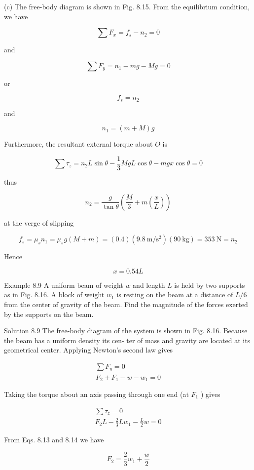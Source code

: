 \documentclass[10pt]{article}
\begin{document}
(c) The free-body diagram is shown in Fig. 8.15. From the equilibrium condition, we have

$$
\sum F_{x}=f_{s}-n_{2}=0
$$

and

$$
\sum F_{y}=n_{1}-m g-M g=0
$$

or

$$
f_{s}=n_{2}
$$

and

$$
n_{1}=(m+M) g
$$

Furthermore, the resultant external torque about $O$ is

$$
\sum \tau_{z}=n_{2} L \sin \theta-\frac{1}{3} M g L \cos \theta-m g x \cos \theta=0
$$

thus

$$
n_{2}=\frac{g}{\tan \theta}\left(\frac{M}{3}+m\left(\frac{x}{L}\right)\right)
$$

at the verge of slipping

$$
f_{s}=\mu_{s} n_{1}=\mu_{s} g(M+m)=(0.4)\left(9.8 \mathrm{~m} / \mathrm{s}^{2}\right)(90 \mathrm{~kg})=353 \mathrm{~N}=n_{2}
$$

Hence

$$
x=0.54 L
$$

Example 8.9 A uniform beam of weight $w$ and length $L$ is held by two supports as in Fig. 8.16. A block of weight $w_{1}$ is resting on the beam at a distance of $L / 6$ from the center of gravity of the beam. Find the magnitude of the forces exerted by the supports on the beam.

Solution 8.9 The free-body diagram of the system is shown in Fig. 8.16. Because the beam has a uniform density its cen- ter of mass and gravity are located at its geometrical center. Applying Newton's second law gives


\begin{gather*}
\sum F_{y}=0 \\
F_{2}+F_{1}-w-w_{1}=0 \tag{8.13}
\end{gather*}


Taking the torque about an axis passing through one end (at $F_{1}$ ) gives


\begin{gather*}
\sum \tau_{z}=0 \\
F_{2} L-\frac{2}{3} L w_{1}-\frac{L}{2} w=0 \tag{8.14}
\end{gather*}


From Eqs. 8.13 and 8.14 we have

$$
F_{2}=\frac{2}{3} w_{1}+\frac{w}{2}
$$
\end{document}
